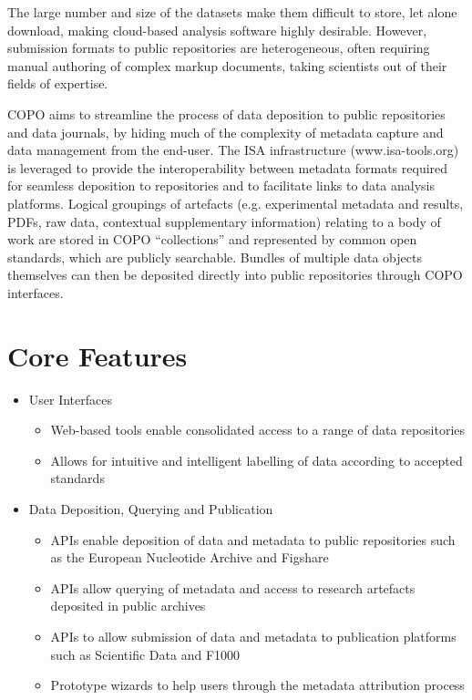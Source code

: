 \documentclass[runningheads,a4paper]{llncs}
\begin{document}
The large number and size of the datasets make them difficult to
store, let alone download, making cloud-based analysis software highly
desirable. However, submission formats to public repositories are
heterogeneous, often requiring manual authoring of complex markup
documents, taking scientists out of their fields of expertise.

COPO aims to streamline the process of data deposition to public
repositories and data journals, by hiding much of the complexity of
metadata capture and data management from the end-user. The ISA
infrastructure (www.isa-tools.org) is leveraged to provide the
interoperability between metadata formats required for seamless
deposition to repositories and to facilitate links to data analysis
platforms. Logical groupings of artefacts (e.g. experimental metadata
and results, PDFs, raw data, contextual supplementary information)
relating to a body of work are stored in COPO ``collections'' and
represented by common open standards, which are publicly
searchable. Bundles of multiple data objects themselves can then be
deposited directly into public repositories through COPO interfaces.

\vspace*{-0.2in}
\section{Core Features}
\vspace*{-0.1in}
\begin{itemize}
\item User Interfaces
  \begin{itemize}
  \item Web-based tools enable consolidated access to a range of data
    repositories
  \item Allows for intuitive and intelligent labelling of data
    according to accepted standards
  \end{itemize}
\item Data Deposition, Querying and Publication
  \begin{itemize}
  \item APIs enable deposition of data and metadata to public
    repositories such as the European Nucleotide Archive and Figshare
  \item APIs allow querying of metadata and access to research
    artefacts deposited in public archives
  \item APIs to allow submission of data and metadata to publication
    platforms such as Scientific Data and F1000
  \item Prototype wizards to help users through the metadata
    attribution process
  \end{itemize}
\end{itemize}
\end{document}
